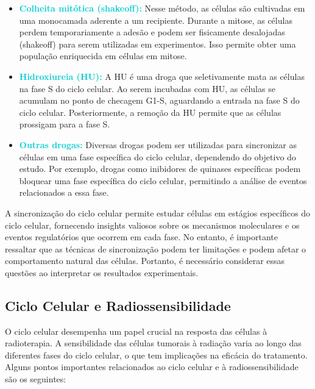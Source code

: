 \documentclass[11pt,a4paper]{article}
\newcounter{exemplo}
\begin{document}
	\begin{itemize}
	\item \textcolor{DarkTurquoise}{\textbf{Colheita mitótica (shakeoff):}} Nesse método, as células são cultivadas em uma monocamada aderente a um recipiente. Durante a mitose, as células perdem temporariamente a adesão e podem ser fisicamente desalojadas (shakeoff) para serem utilizadas em experimentos. Isso permite obter uma população enriquecida em células em mitose.

	\item \textcolor{DarkTurquoise}{\textbf{Hidroxiureia (HU):}} A HU é uma droga que seletivamente mata as células na fase S do ciclo celular. Ao serem incubadas com HU, as células se acumulam no ponto de checagem G1-S, aguardando a entrada na fase S do ciclo celular. Posteriormente, a remoção da HU permite que as células prossigam para a fase S.

	\item \textcolor{DarkTurquoise}{\textbf{Outras drogas:}} Diversas drogas podem ser utilizadas para sincronizar as células em uma fase específica do ciclo celular, dependendo do objetivo do estudo. Por exemplo, drogas como inibidores de quinases específicas podem bloquear uma fase específica do ciclo celular, permitindo a análise de eventos relacionados a essa fase.
	\end{itemize}

	A sincronização do ciclo celular permite estudar células em estágios específicos do ciclo celular, fornecendo insights valiosos sobre os mecanismos moleculares e os eventos regulatórios que ocorrem em cada fase. No entanto, é importante ressaltar que as técnicas de sincronização podem ter limitações e podem afetar o comportamento natural das células. Portanto, é necessário considerar essas questões ao interpretar os resultados experimentais.

\subsection*{Ciclo Celular e Radiossensibilidade}

	O ciclo celular desempenha um papel crucial na resposta das células à radioterapia. A sensibilidade das células tumorais à radiação varia ao longo das diferentes fases do ciclo celular, o que tem implicações na eficácia do tratamento. Alguns pontos importantes relacionados ao ciclo celular e à radiossensibilidade são os seguintes:
\end{document}
